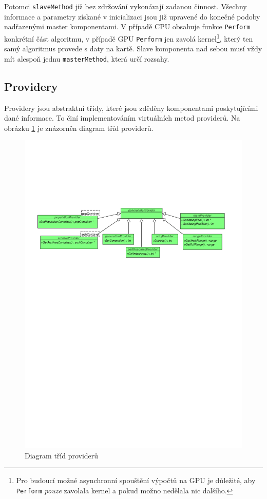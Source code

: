 Potomci \texttt{slaveMethod} již bez zdržování vykonávají zadanou činnost. Všechny informace a parametry získané v inicializaci jsou již upravené do konečné podoby nadřazenými master komponentami. V případě CPU obsahuje funkce \texttt{Perform} konkrétní část algoritmu, v případě GPU \texttt{Perform} jen zavolá kernel\footnote{Pro budoucí možné asynchronní spouštění výpočtů na GPU je důležité, aby \texttt{Perform} \emph{pouze} zavolala kernel a pokud možno nedělala nic dalšího.}, který ten samý algoritmus provede s daty na kartě. Slave komponenta nad sebou musí vždy mít alespoň jednu \texttt{masterMethod}, která určí rozsahy.

\subsection{Providery}

Providery jsou abstraktní třídy, které jsou zděděny komponentami poskytujícími dané informace. To činí implementováním virtuálních metod providerů. Na obrázku \ref{providers} je znázorněn diagram tříd providerů.

\begin{figure}[h!]
  \includegraphics[width=\textwidth]{img/providers}
  \caption{Diagram tříd providerů}\label{providers}
\end{figure}

